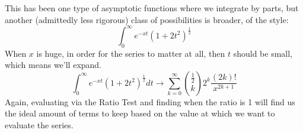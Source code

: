 \documentclass{article}
\begin{document}
\\ \\ 
This has been one type of asymptotic functions where we integrate by parts, but another (admittedly less rigorous) class of possibilities is broader, of the style:
\[\int_{0}^{\infty} e^{-xt}(1+2t^2)^{\frac 1 2}\]
When $x$ is huge, in order for the series to matter at all, then $t$ should be small, which means we'll expand. 
\[\int_{0}^{\infty} e^{-xt}(1+2t^2)^{\frac 1 2} dt \rightarrow \sum_{k=0}^{\infty} {\frac 1 2\choose k} 2^k \frac{(2k)!}{x^{2k+1}}\]
Again, evaluating via the Ratio Test and finding when the ratio is 1 will find us the ideal amount of terms to keep based on the value at which we want to evaluate the series.
\end{document}
